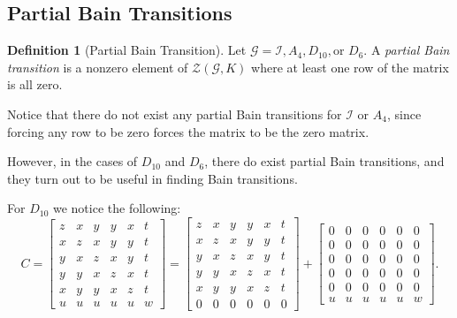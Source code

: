 \documentclass[a4paper,10pt]{article}
\theoremstyle{plain}
\theoremstyle{definition}
\newtheorem{Definition}[Theorem]{Definition}
\theoremstyle{remark}
\begin{document}
\subsection{Partial Bain Transitions}
\begin{Definition}[Partial Bain Transition]
    Let \(\mathcal{G} = \mathcal{I}, A_4, D_{10}, \text{or } D_6\).
    A \emph{partial Bain transition} is a nonzero element of \(\mathcal{Z}(\mathcal{G}, K)\) where at least one row of the matrix is all zero.
\end{Definition}
Notice that there do not exist any partial Bain transitions for \(\mathcal{I}\) or \(A_4\), since forcing any row to be zero forces the matrix to be the zero matrix.

However, in the cases of \(D_{10}\) and \(D_6\), there do exist partial Bain transitions, and they turn out to be useful in finding Bain transitions.

For \(D_{10}\) we notice the following:
\[C = \begin{bmatrix}
    z & x & y & y & x & t \\
    x & z & x & y & y & t \\
    y & x & z & x & y & t \\
    y & y & x & z & x & t \\
    x & y & y & x & z & t \\
    u & u & u & u & u & w
\end{bmatrix} = \begin{bmatrix}
    z & x & y & y & x & t \\
    x & z & x & y & y & t \\
    y & x & z & x & y & t \\
    y & y & x & z & x & t \\
    x & y & y & x & z & t \\
    0 & 0 & 0 & 0 & 0 & 0
\end{bmatrix} + \begin{bmatrix}
    0 & 0 & 0 & 0 & 0 & 0 \\
    0 & 0 & 0 & 0 & 0 & 0 \\
    0 & 0 & 0 & 0 & 0 & 0 \\
    0 & 0 & 0 & 0 & 0 & 0 \\
    0 & 0 & 0 & 0 & 0 & 0 \\
    u & u & u & u & u & w
\end{bmatrix}.\]
\end{document}
